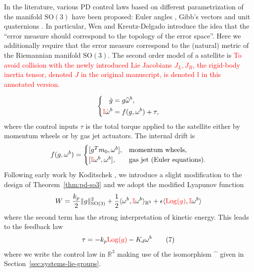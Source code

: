 \documentclass[10pt,twocolumn]{article}
\newcommand{\rev}[1]{\textcolor{red}{#1}}
\newcommand{\Log}{\operatorname{Log}}
\newcommand{\SO}{\mathrm{SO}}
\newcommand{\R}{\mathbb R}
\begin{document}
In the literature, various PD control laws based on different parametrization of the manifold $\SO(3)$ have been proposed: Euler angles \cite{11}, Gibb's vectors \cite{12} and unit quaternions \cite{13}. In particular, Wen and Kreutz-Delgado \cite{13} introduce the idea that the ``error measure should correspond to the topology of the error space''. Here we additionally require that the error measure correspond to the (natural) metric of the Riemannian manifold $\SO(3)$. The second order model of a satellite is
\rev{To avoid collision with the newly introduced Lie Jacobians $J_L,J_R$, the rigid-body inertia tensor, denoted $J$ in the original manuscript, is denoted $\mathbb I$ in this annotated version.}\par
\begin{equation*}
\left\{\begin{aligned}
\dot g&=g\widehat\omega^b,\\
\rev{\mathbb I}\dot\omega^b&=f(g,\omega^b)+\tau,
\end{aligned}\right.
\end{equation*}
where the control inputs $\tau$ is the total torque applied to the satellite either by momentum wheels or by gas jet actuators. The internal drift is
\begin{equation*}
f(g,\omega^b)=
\begin{cases}
[g^Tm_0,\omega^b],&\text{momentum wheels},\\
[\rev{\mathbb I}\omega^b,\omega^b],&\text{gas jet (Euler equations)}.
\end{cases}
\end{equation*}
Following early work by Koditschek \cite{14}, we introduce a slight modification to the design of Theorem~\ref{thm:pd-so3} and we adopt the modified Lyapunov function
\begin{equation*}
W=\frac{k_p}{2}\|g\|_{\SO(3)}^2+\frac12\langle\omega^b,\rev{\mathbb I}\omega^b\rangle_{\R^3}
+\epsilon\langle\rev{\Log(g)},\rev{\mathbb I}\omega^b\rangle
\end{equation*}
where the second term has the strong interpretation of kinetic energy. This leads to the feedback law
\begin{equation*}
\tau=-k_p\rev{\Log(g)}-K_d\omega^b\tag{7}\label{eq:7}
\end{equation*}
where we write the control law in $\R^3$ making use of the isomorphism $\widehat{\phantom{x}}$ given in Section~\ref{sec:systems-lie-groups}.
\end{document}
